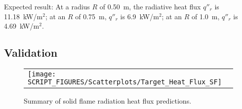 \noindent Expected result: At a radius $R$ of 0.50~m, the radiative heat flux $q''_{r}$ is 11.18~kW/m$^2$; at an $R$ of 0.75~m, $q''_{r}$ is 6.9~kW/m$^2$; at an $R$ of 1.0~m, $q''_{r}$ is 4.69~kW/m$^2$.

\subsection*{Validation}

\begin{figure}[!ht]
\begin{center}
\begin{tabular}{l}
\texttt{[image: SCRIPT\_FIGURES/Scatterplots/Target\_Heat\_Flux\_SF]}
\end{tabular}
\end{center}
\caption[Summary of solid flame radiation heat flux predictions]
{Summary of solid flame radiation heat flux predictions.}
\label{Heat_Flux_Solid_Flame_Summary}
\end{figure}
